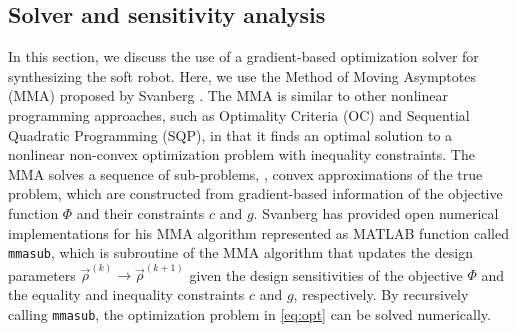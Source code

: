 \subsection{Solver and sensitivity analysis}
In this section, we discuss the use of a gradient-based optimization solver for synthesizing the soft robot. Here, we use the Method of Moving Asymptotes (MMA) proposed by Svanberg \cite{Svanberg1987Feb}. The MMA is similar to other nonlinear programming approaches, such as Optimality Criteria (OC) and Sequential Quadratic Programming (SQP), in that it finds an optimal solution to a nonlinear non-convex optimization problem with inequality constraints. The MMA solves a sequence of sub-problems, \ie, convex approximations of the true problem, which are constructed from gradient-based information of the objective function $\Phi$ and their constraints $c$ and $g$. Svanberg \cite{Svanberg1987Feb} has provided open numerical implementations for his MMA algorithm represented as MATLAB function called \texttt{mmasub}, which is subroutine of the MMA algorithm that updates the design parameters $\vec{\rho}^{(k)} \to \vec{\rho}^{(k+1)}$ given the design sensitivities of the objective $\Phi$ and the equality and inequality constraints $c$ and $g$, respectively. By recursively calling \texttt{mmasub}, the optimization problem in \eqref{eq:opt} can be solved numerically.

